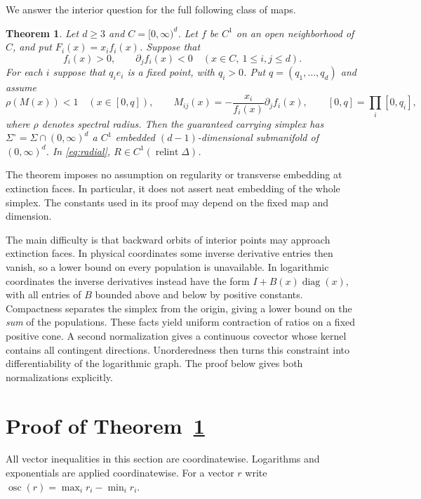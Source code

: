 \documentclass[11pt]{article}
\newtheorem{theorem}{Theorem}
\newcommand{\diag}{\operatorname{diag}}
\newcommand{\osc}{\operatorname{osc}}
\newcommand{\relint}{\operatorname{relint}}
\begin{document}
We answer the interior question for the full following class of maps.

\begin{theorem}\label{thm:main}
Let $d\geq3$ and $C=[0,\infty)^d$. Let $f$ be $C^1$ on an open
neighborhood of $C$, and put $F_i(x)=x_i f_i(x)$. Suppose that
\[
 f_i(x)>0,\qquad \partial_j f_i(x)<0
 \quad(x\in C,\ 1\leq i,j\leq d).
\]
For each $i$ suppose that $q_i e_i$ is a fixed point, with $q_i>0$.
Put $q=(q_1,\ldots,q_d)$ and assume
\begin{equation}\label{eq:spectral}
 \rho(M(x))<1\quad(x\in[0,q]),\qquad
 M_{ij}(x)=-\frac{x_i}{f_i(x)}\partial_j f_i(x),
 \qquad [0,q]=\prod_i[0,q_i],
\end{equation}
where $\rho$ denotes spectral radius.
Then the guaranteed carrying simplex has
$\Sigma^\circ=\Sigma\cap(0,\infty)^d$ a $C^1$ embedded
$(d-1)$-dimensional submanifold of $(0,\infty)^d$.
In \eqref{eq:radial}, $R\in C^1(\relint\Delta)$.
\end{theorem}

The theorem imposes no assumption on regularity or transverse embedding at
extinction faces. In particular, it does not assert neat embedding of the
whole simplex. The constants used in its proof may depend on the fixed map
and dimension.

The main difficulty is that backward orbits of interior points may approach
extinction faces. In physical coordinates some inverse derivative entries
then vanish, so a lower bound on every population is unavailable. In
logarithmic coordinates the inverse derivatives instead have the form
$I+B(x)\diag(x)$, with all entries of $B$ bounded above and below by positive
constants. Compactness separates the simplex from the origin, giving a lower
bound on the \emph{sum} of the populations. These facts yield uniform
contraction of ratios on a fixed positive cone. A second normalization gives
a continuous covector whose kernel contains all contingent directions.
Unorderedness then turns this constraint into differentiability of the
logarithmic graph. The proof below gives both normalizations explicitly.

\section{Proof of Theorem~\ref{thm:main}}

All vector inequalities in this section are coordinatewise. Logarithms and
exponentials are applied coordinatewise. For a vector $r$ write
$\osc(r)=\max_i r_i-\min_i r_i$.
\end{document}
